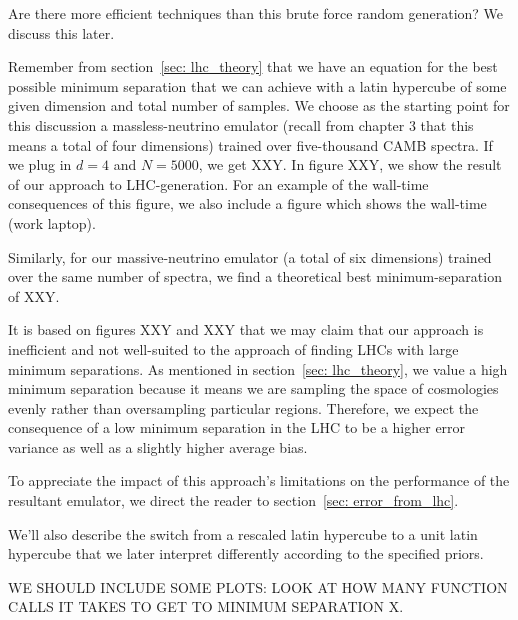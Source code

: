 Are there more efficient techniques than this brute force random generation?
We discuss this later. 

Remember from section~\ref{sec: lhc_theory} that we have an equation for the
best possible minimum separation that we can achieve with a latin hypercube
of some given dimension and total number of samples. We choose as the starting
point for this discussion a massless-neutrino emulator (recall from chapter 3
that this means a total of four dimensions) trained over five-thousand CAMB
spectra. If we plug in $d = 4$ and $N=5000$, we get XXY. In figure XXY, we
show the result of our approach to LHC-generation. For an example of the
wall-time consequences of this figure, we also include a figure which shows
the wall-time (work laptop).

Similarly, for our massive-neutrino emulator (a total of six dimensions)
trained over the same number of spectra, we find a theoretical best
minimum-separation of XXY. 

It is based on figures XXY and XXY that we may claim that our approach is
inefficient and not well-suited to the approach of finding LHCs with large
minimum separations. As mentioned in section~\ref{sec: lhc_theory},
we value a high minimum separation because it means we are sampling the
space of cosmologies evenly rather than oversampling particular regions.
Therefore, we expect the consequence of a low minimum separation in the LHC to
be a higher error variance as well as a slightly higher average bias.


To appreciate the impact of this approach's limitations on the performance of
the resultant emulator, we direct the reader to
section~\ref{sec: error_from_lhc}.



We'll also describe the switch from a rescaled latin hypercube to a unit latin hypercube that we later interpret differently according to the specified priors.

WE SHOULD INCLUDE SOME PLOTS: LOOK AT HOW MANY FUNCTION CALLS IT TAKES TO GET
TO MINIMUM SEPARATION X.

